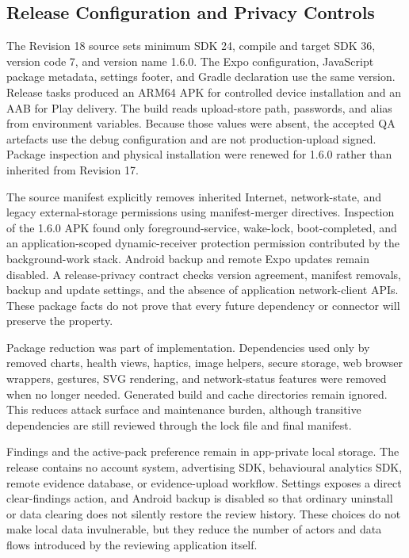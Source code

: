\subsection{Release Configuration and Privacy Controls}

The Revision 18 source sets minimum SDK 24, compile and target SDK 36, version code 7, and version name 1.6.0. The Expo configuration, JavaScript package metadata, settings footer, and Gradle declaration use the same version. Release tasks produced an ARM64 APK for controlled device installation and an AAB for Play delivery. The build reads upload-store path, passwords, and alias from environment variables. Because those values were absent, the accepted QA artefacts use the debug configuration and are not production-upload signed. Package inspection and physical installation were renewed for 1.6.0 rather than inherited from Revision 17.

The source manifest explicitly removes inherited Internet, network-state, and legacy external-storage permissions using manifest-merger directives. Inspection of the 1.6.0 APK found only foreground-service, wake-lock, boot-completed, and an application-scoped dynamic-receiver protection permission contributed by the background-work stack. Android backup and remote Expo updates remain disabled. A release-privacy contract checks version agreement, manifest removals, backup and update settings, and the absence of application network-client APIs. These package facts do not prove that every future dependency or connector will preserve the property.

Package reduction was part of implementation. Dependencies used only by removed charts, health views, haptics, image helpers, secure storage, web browser wrappers, gestures, SVG rendering, and network-status features were removed when no longer needed. Generated build and cache directories remain ignored. This reduces attack surface and maintenance burden, although transitive dependencies are still reviewed through the lock file and final manifest.

Findings and the active-pack preference remain in app-private local storage. The release contains no account system, advertising SDK, behavioural analytics SDK, remote evidence database, or evidence-upload workflow. Settings exposes a direct clear-findings action, and Android backup is disabled so that ordinary uninstall or data clearing does not silently restore the review history. These choices do not make local data invulnerable, but they reduce the number of actors and data flows introduced by the reviewing application itself.

